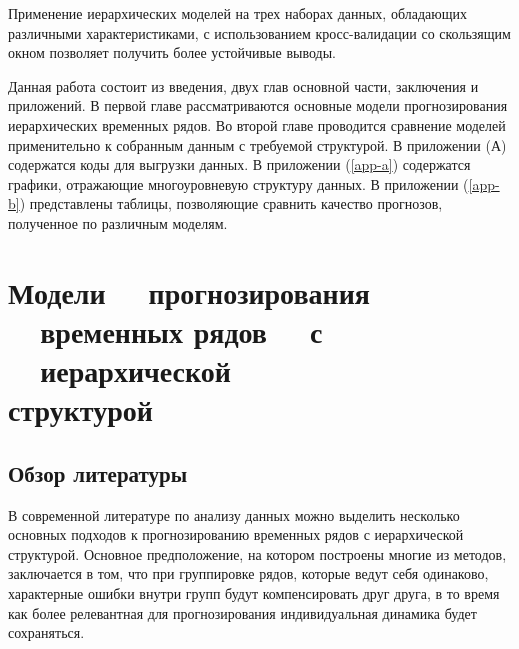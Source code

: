 \documentclass[12pt,a4paper, oneside]{extreport}
\begin{document}

Применение иерархических моделей на трех наборах данных, обладающих различными характеристиками,    с использованием кросс-валидации со скользящим окном позволяет получить более устойчивые  выводы. 





Данная работа состоит из введения, двух глав основной части, заключения и приложений. В первой главе рассматриваются основные модели прогнозирования иерархических временных рядов.  Во второй главе проводится  сравнение моделей применительно к собранным данным с требуемой структурой. 
В приложении (А) содержатся коды для выгрузки данных.     В приложении (\ref{app-a}) содержатся графики, отражающие многоуровневую структуру данных. В приложении (\ref{app-b}) представлены таблицы, позволяющие сравнить качество прогнозов, полученное по различным моделям. 










\chapter{Модели \ \ прогнозирования \ \ временных рядов \ \   с \ \ иерархической \\ структурой}



\section{Обзор литературы}




В современной  литературе по анализу данных можно выделить несколько основных подходов к  прогнозированию временных рядов с иерархической структурой. 
Основное предположение, на котором построены многие из методов, заключается в том, что при группировке  рядов, которые ведут себя одинаково, характерные ошибки внутри групп будут  компенсировать друг друга, в то время как более релевантная для прогнозирования  индивидуальная динамика будет сохраняться.
\end{document}
